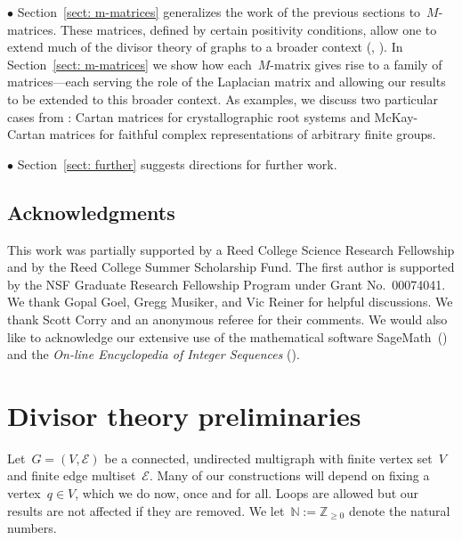 \documentclass{amsart}
\newcommand{\Z}{\mathbb{Z}}
\newcommand{\N}{\mathbb{N}}
\begin{document}
\noindent$\bullet$ Section~\ref{sect: m-matrices} generalizes the work of the
previous sections to~$M$-matrices.   These matrices, defined by certain
positivity conditions, allow one to extend much of the divisor theory of
graphs to a broader context (\cite{Gabrielov}, \cite{Guzman}).  In
Section~\ref{sect: m-matrices} we show how each~$M$-matrix gives rise to a
family of matrices---each serving the role of the Laplacian matrix and allowing our
results to be extended to this broader context.  As examples, we discuss two
particular cases from \cite{BKR}: Cartan matrices for crystallographic root
systems and McKay-Cartan matrices for faithful complex representations of
arbitrary finite groups.  
\smallskip

\noindent$\bullet$ Section~\ref{sect: further} suggests directions for further
work.


\subsection*{Acknowledgments} This work
was partially supported by a Reed College Science Research Fellowship and by the
Reed College Summer Scholarship Fund. The first author is supported by the NSF
Graduate Research Fellowship Program under Grant No.~00074041.  We thank Gopal
Goel, Gregg Musiker, and Vic Reiner for helpful discussions.  We thank Scott
Corry and an anonymous referee for their
comments.  We would also like to acknowledge our extensive use of the
mathematical software SageMath~(\cite{Sage}) and the {\em On-line Encyclopedia
of Integer Sequences} (\cite{oeis}).

\section{Divisor theory preliminaries}\label{sect: prelims}  

Let~$G=(V,\mathcal{E})$ be a connected, undirected multigraph with finite vertex
set~$V$ and finite edge multiset~$\mathcal{E}$.   Many of our constructions will
depend on fixing a vertex~$q\in V$, which we do now, once and for all.  Loops
are allowed but our results are not affected if they are removed.  We
let~$\N:=\Z_{\geq0}$ denote the natural numbers.
\end{document}
